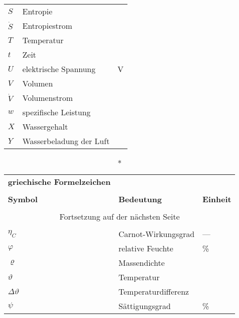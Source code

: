 \begin{onehalfspacing}
\begin{longtable}[h]{p{} p{} p{}}
		$S$ & Entropie & \joule\per\kelvin\\
		$\dot{S}$ & Entropiestrom & \watt\per\kelvin\\
		$T$ & Temperatur & \kelvin\\
		$t$ & Zeit & \second\\
		$U$ & elektrische Spannung & V \\
		$V$ & Volumen & \cubic\meter\\
		$\dot{V}$&Volumenstrom&\cubic\meter\per\second\\
		$w$ & spezifische Leistung & \watt \per \kilogram\\
		$X$	& Wassergehalt & \kilogram \per \kilogram \\
		$Y$ & Wasserbeladung der Luft & \gram\per\kilogram\\
		
\end{longtable}

\begin{longtable}[h]{p{} p{} p{}}
		\caption*{\textbf{griechische Formelzeichen}} \\
		\\
		\textbf{Symbol} & \textbf{Bedeutung} & \textbf{Einheit} \\ %
		\endhead
		\\
		\multicolumn{3}{c}{Fortsetzung auf der nächsten Seite} \\
		\endfoot
		\multicolumn{3}{c}{ } \\
		\endlastfoot
		
		$\eta_{C}$ & Carnot-Wirkungsgrad & ---\\
		$\varphi$ & relative Feuchte & \% \\
		$\varrho$& Massendichte&\kilogrampercubicmetre\\
		$\vartheta $ & Temperatur  & \degreecelsius\\
		$\Delta\vartheta $ & Temperaturdifferenz  &\kelvin\\
		$\psi$ & Sättigungsgrad & \% \\
\end{longtable}


\end{onehalfspacing}
